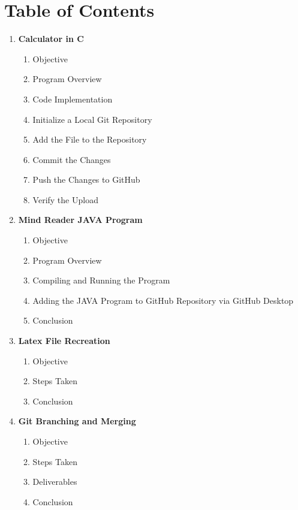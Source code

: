 \section*{Table of Contents}

\begin{enumerate}
    \item \textbf{Calculator in C}
    \begin{enumerate}
        \renewcommand{\labelenumii}{\arabic{enumi}.\arabic{enumii}}
        \item Objective
        \item Program Overview
        \item Code Implementation
        \item Initialize a Local Git Repository
        \item Add the File to the Repository
        \item Commit the Changes
        \item Push the Changes to GitHub
        \item Verify the Upload
    \end{enumerate}

    \item \textbf{Mind Reader JAVA Program}
    \begin{enumerate}
        \renewcommand{\labelenumii}{\arabic{enumi}.\arabic{enumii}}
        \item Objective
        \item Program Overview
        \item Compiling and Running the Program
        \item Adding the JAVA Program to GitHub Repository via GitHub Desktop
        \item Conclusion
    \end{enumerate}

    \item \textbf{Latex File Recreation}
    \begin{enumerate}
        \renewcommand{\labelenumii}{\arabic{enumi}.\arabic{enumii}}
        \item Objective
        \item Steps Taken
        \item Conclusion
    \end{enumerate}

    \item \textbf{Git Branching and Merging}
    \begin{enumerate}
        \renewcommand{\labelenumii}{\arabic{enumi}.\arabic{enumii}}
        \item Objective
        \item Steps Taken
        \item Deliverables
        \item Conclusion
    \end{enumerate}


\end{enumerate}
